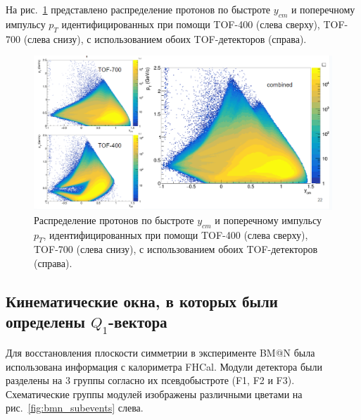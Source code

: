 На рис.~\ref{fig:bmn_pt_y} представлено распределение протонов по быстроте $y_{cm}$ и поперечному импульсу $p_T$ идентифицированных при помощи TOF-400 (слева сверху), TOF-700 (слева снизу), с использованием обоих TOF-детекторов (справа).
%
\begin{figure}[ht]
\begin{center}
\includegraphics[width=0.95\linewidth]{images/bmn_pt_y_acceptance.png}
\caption{Распределение протонов по быстроте $y_{cm}$ и поперечному импульсу $p_T$, идентифицированных при помощи TOF-400 (слева сверху), TOF-700 (слева снизу), с использованием обоих TOF-детекторов (справа).}
\label{fig:bmn_pt_y}
\end{center}
\end{figure}


\subsection{Кинематические окна, в которых были определены $Q_1$-вектора}

Для восстановления плоскости симметрии в эксперименте BM@N была использована информация с калориметра FHCal.
Модули детектора были разделены на 3 группы согласно их псевдобыстроте (F1, F2 и F3).
Схематические группы модулей изображены различными цветами на рис.~\ref{fig:bmn_subevents} слева.

